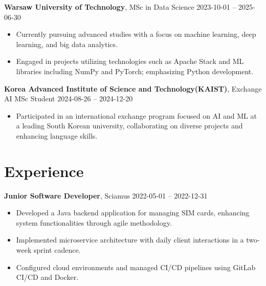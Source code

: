 \documentclass[10pt, letterpaper]{article}
\begin{document}
\begin{paracol}{2}
\noindent\textbf{Warsaw University of Technology}, MSc in Data Science \switchcolumn
\hfill 2023-10-01 -- 2025-06-30
\end{paracol}

\vspace{5pt}

\begin{itemize}
    
    \item Currently pursuing advanced studies with a focus on machine learning, deep learning, and big data analytics.
    
    \item Engaged in projects utilizing technologies such as Apache Stack and ML libraries including NumPy and PyTorch; emphasizing Python development.
    
\end{itemize}

\begin{paracol}{2}
\noindent\textbf{Korea Advanced Institute of Science and Technology(KAIST)}, Exchange AI MSc Student \switchcolumn
\hfill 2024-08-26 -- 2024-12-20
\end{paracol}

\vspace{5pt}

\begin{itemize}
    
    \item Participated in an international exchange program focused on AI and ML at a leading South Korean university, collaborating on diverse projects and enhancing language skills.
    
\end{itemize}


\section*{Experience}

\begin{paracol}{2}
\noindent\textbf{Junior Software Developer}, Sciamus \switchcolumn
\hfill 2022-05-01 -- 2022-12-31
\end{paracol}

\vspace{5pt}

\begin{itemize}
    
    \item Developed a Java backend application for managing SIM cards, enhancing system functionalities through agile methodology.
    
    \item Implemented microservice architecture with daily client interactions in a two-week sprint cadence.
    
    \item Configured cloud environments and managed CI/CD pipelines using GitLab CI/CD and Docker.
    
\end{itemize}
\end{document}
